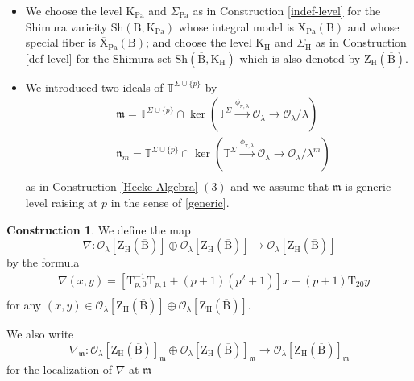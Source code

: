 \documentclass[10pt]{amsart}
\numberwithin{equation}{section}
\theoremstyle{definition}
\newtheorem{construction}[equation]{Construction}
\def\Pa{\mathrm{Pa}}
\def\calO{\mathcal{O}}
\def\fracm{\mathfrak{m}}
\def\fracn{\mathfrak{n}}
\def\TT{\mathbb{T}}
\def\rmB{\mathrm{B}}
\def\rmH{\mathrm{H}}
\def\rmK{\mathrm{K}}
\def\rmX{\mathrm{X}}
\def\rmT{\mathrm{T}}
\def\rmZ{\mathrm{Z}}
\def\Sh{\mathrm{Sh}}
\begin{document}
\begin{itemize}
\item We choose the level $\rmK_{\Pa}$ and $\Sigma_{\Pa}$ as in Construction \ref{indef-level} for the Shimura varieity $\Sh(\rmB, \rmK_{\Pa})$ whose integral model is $\rmX_{\Pa}(\rmB)$ and whose special fiber is $\overline{\rmX}_{\Pa}(\rmB)$; and choose the level  $\rmK_{\rmH}$ and $\Sigma_{\rmH}$ as in Construction \ref{def-level}  for the Shimura set $\Sh(\overline{\rmB}, \rmK_{\rmH})$ which is also denoted by $\rmZ_{\rmH}(\overline{\rmB})$.
\item We introduced two ideals of $\TT^{\Sigma\cup\{p\}}$ by
\begin{equation}
\begin{aligned}
&\fracm=\TT^{\Sigma\cup\{p\}}\cap \ker(\TT^{\Sigma}\xrightarrow{\phi_{\pi,\lambda}}\calO_{\lambda}\rightarrow\calO_{\lambda}/\lambda)\\
&\fracn_{m}=\TT^{\Sigma\cup\{p\}}\cap \ker(\TT^{\Sigma}\xrightarrow{\phi_{\pi,\lambda}}\calO_{\lambda}\rightarrow\calO_{\lambda}/\lambda^{m})\\
\end{aligned}
\end{equation}
as in Construction \ref{Hecke-Algebra} $(3)$ and we assume that $\fracm$ is generic level raising at $p$ in the sense of \ref{generic}.
\end{itemize}
\begin{construction}
We define the map 
\begin{equation*}
\nabla: \calO_{\lambda}[\rmZ_{\rmH}(\overline{\rmB})]\oplus \calO_{\lambda}[\rmZ_{\rmH}(\overline{\rmB})]\rightarrow \calO_{\lambda}[\rmZ_{\rmH}(\overline{\rmB})]
\end{equation*}
by the formula
\begin{equation*}
\begin{aligned}
&\nabla(x, y)=[\rmT^{-1}_{p, 0}\rmT_{p,1}+(p+1)(p^{2}+1)]x-(p+1)\rmT_{20}y \\
\end{aligned}
\end{equation*}
for any $(x, y)\in \calO_{\lambda}[\rmZ_{\rmH}(\overline{\rmB})]\oplus\calO_{\lambda}[\rmZ_{\rmH}(\overline{\rmB})]$.  

We also write 
\begin{equation*}
\nabla_{\fracm}:  \calO_{\lambda}[\rmZ_{\rmH}(\overline{\rmB})]_{\fracm}\oplus \calO_{\lambda}[\rmZ_{\rmH}(\overline{\rmB})]_{\fracm}\rightarrow \calO_{\lambda}[\rmZ_{\rmH}(\overline{\rmB})]_{\fracm} 
\end{equation*}
for the localization of $\nabla$ at $\fracm$
\end{construction}
\end{document}
